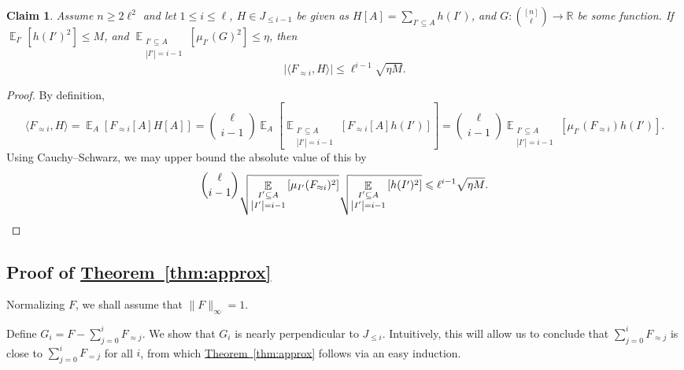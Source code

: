 \documentclass[11pt]{article}
\newcommand{\expref}[2]{\texorpdfstring{\hyperref[#2]{#1~\ref{#2}}}{#1~\ref{#2}}}
\newtheorem{claim}[theorem]{Claim}
\newcommand\card[1]{\left| {#1} \right|}
\newcommand\Expect[2]{{\mathop{\mathbb{E}}_{#1}\left[ {#2} \right]}}
\newcommand\norm[1]{\| #1 \|}
\newcommand\inner[2]{\langle{#1},{#2}\rangle}
\renewcommand\geq{\geqslant}
\renewcommand\leq{\leqslant}
\newcommand\lvlfn[2]{{#1}_{={#2}}}
\newcommand\approxlvlfn[2]{{#1}_{\approx{#2}}}
\begin{document}
\begin{claim}\label{claim:approx_almost_ortho}
  Assume $n\geq 2\ell^2$ and let $1\leq i\leq \ell$, $H\in J_{\leq i-1}$ be given as $H[A] = \sum\limits_{I'\subseteq A} h(I')$,
  and $G\colon \binom{[n]}{\ell}\to\mathbb{R}$ be some function. If $\Expect{I'}{h(I')^2}\leq M$, and
  $\Expect{\substack{I'\subseteq A\\ \card{I'} = i-1}}{\mu_{I'}(G)^2}\leq \eta$, then
  \[
  \card{\inner{\approxlvlfn{F}{i}}{H}}\leq \ell^{i-1}\sqrt{\eta M}.
  \]
\end{claim}
\begin{proof}
  By definition,
  \[
  \inner{\approxlvlfn{F}{i}}{H}
  =\Expect{A}{\approxlvlfn{F}{i}[A] H[A]}
  =\binom{\ell}{i-1}\Expect{A}{\Expect{\substack{I'\subseteq A\\ \card{I'} = i-1}}{\approxlvlfn{F}{i}[A]h(I')}}
  =\binom{\ell}{i-1}\Expect{\substack{I'\subseteq A\\ \card{I'} = i-1}}{\mu_{I'}(\approxlvlfn{F}{i})h(I')}.
  \]
  Using Cauchy--Schwarz, we may upper bound the absolute value of this by
  \[
  \binom{\ell}{i-1}
  \sqrt{\Expect{\substack{I'\subseteq A\\ \card{I'} = i-1}}{\mu_{I'}(\approxlvlfn{F}{i})^2}}
  \sqrt{\Expect{\substack{I'\subseteq A\\ \card{I'} = i-1}}{h(I')^2}}
  \leq \ell^{i-1}\sqrt{\eta M}.\qedhere
  \]
\end{proof}

\subsection{Proof of \expref{Theorem}{thm:approx}}  
\label{sec:proofofThm:approx}   %
Normalizing $F$, we shall assume that $\norm{F}_{\infty} = 1$.

Define $G_i = F - \sum\limits_{j=0}^{i} \approxlvlfn{F}{j}$. We show that $G_i$ is nearly perpendicular to $J_{\leq i}$. Intuitively, this will allow us to conclude that $\sum\limits_{j=0}^{i} \approxlvlfn{F}{j}$
is close to $\sum\limits_{j=0}^{i} \lvlfn{F}{j}$ for all $i$, from which \expref{Theorem}{thm:approx} follows via an easy induction.
\end{document}
